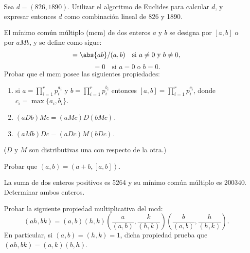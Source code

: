\documentclass[12pt,a4paper]{book}
\begin{document}
    \begin{ejercicio}
        Sea $d=(826,1890)$. Utilizar el algoritmo de Euclides para calcular $d$, y expresar
        entonces $d$ como combinación lineal de 826 y 1890.
    \end{ejercicio}

    \begin{ejercicio}
        El mínimo común múltiplo (mcm) de dos enteros $a$ y $b$ se designa por $[a,b]$ o por\label{sim:lcm}
        $aMb$, y se define como sigue:
        \begin{equation*}
            [a,b]=\abs{ab}/(a,b)\quad\text{si } a\neq0 \text{ y } b\neq0,
        \end{equation*}
        \begin{equation*}
            [a,b]=0\quad\text{si } a=0 \text{ o } b=0.
        \end{equation*}
        Probar que el mcm posee las siguientes propiedades:
        \begin{enumerate}
            \item[(a)] si $a=\prod_{i=1}^{r}p_{i}^{a_{i}}$ y $b=\prod_{i=1}^{r}p_{i}^{b_{i}}$ entonces
            $[a,b]=\prod_{i=1}^{r}p_{i}^{c_{i}}$, donde $c_{i}=\max\{a_{i},b_{i}\}$.
            \item[(b)] $(aDb)Mc=(aMc)D(bMc)$.
            \item[(c)] $(aMb)Dc=(aDc)M(bDc)$.
        \end{enumerate}
        ($D$ y $M$ son distributivas una con respecto de la otra.)
    \end{ejercicio}

    \begin{ejercicio}
        Probar que $(a,b)=(a+b,[a,b])$.
    \end{ejercicio}

    \begin{ejercicio}
        La suma de dos enteros positivos es 5264 y su mínimo común múltiplo es 200340.
        Determinar ambos enteros.
    \end{ejercicio}

    \begin{ejercicio}
        Probar la siguiente propiedad multiplicativa del mcd:
        \begin{equation*}
            (ah,bk)=(a,b)(h,k)\left(\frac{a}{(a,b)},\frac{k}{(h,k)}\right)
            \left(\frac{b}{(a,b)},\frac{h}{(h,k)}\right).
        \end{equation*}
        En particular, si $(a,b)=(h,k)=1$, dicha propiedad prueba que $(ah,bk)=(a,k)(b,h)$.
    \end{ejercicio}
\end{document}
